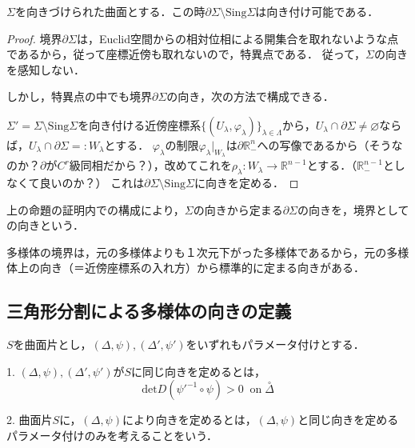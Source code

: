 \documentclass[uplatex, dvipdfmx]{jsreport}
\begin{document}
\begin{proposition*}
    $\Sigma$を向きづけられた曲面とする．この時$\partial\Sigma\setminus\mathrm{Sing}\Sigma$は向き付け可能である．
\end{proposition*}
\begin{proof}
    境界$\partial\Sigma$は，Euclid空間からの相対位相による開集合を取れないような点であるから，従って座標近傍も取れないので，特異点である．
    従って，$\Sigma$の向きを感知しない．

    しかし，特異点の中でも境界$\partial\Sigma$の向き，次の方法で構成できる．

    $\Sigma'=\Sigma\setminus\mathrm{Sing}\Sigma$を向き付ける近傍座標系$\{(U_\lambda,\varphi_\lambda)\}_{\lambda\in\Lambda}$から，$U_\lambda\cap\partial\Sigma\ne\varnothing$ならば，$U_\lambda\cap\partial\Sigma=:W_\lambda$とする．
    $\varphi_\lambda$の制限$\varphi_\lambda|_{W_\lambda}$は$\partial\mathbb{R}^n_-$への写像であるから（そうなのか？$\partial$が$C^r$級同相だから？），改めてこれを$\rho_\lambda:W_\lambda\to\mathbb{R}^{n-1}$とする．（$\mathbb{R}^{n-1}_-$としなくて良いのか？）
    これは$\partial\Sigma\setminus\mathrm{Sing}\Sigma$に向きを定める．
\end{proof}
\begin{definition}
    上の命題の証明内での構成により，$\Sigma$の向きから定まる$\partial\Sigma$の向きを，境界としての向きという．
\end{definition}

\begin{screen}
    多様体の境界は，元の多様体よりも１次元下がった多様体であるから，元の多様体上の向き（＝近傍座標系の入れ方）から標準的に定まる向きがある．
\end{screen}

\subsection{三角形分割による多様体の向きの定義}

\begin{definition}[曲面片の向き]
    $S$を曲面片とし，$(\Delta,\psi),(\Delta',\psi')$をいずれもパラメータ付けとする．
    \begin{center}
    \end{center}

    1. $(\Delta,\psi),(\Delta',\psi')$が$S$に同じ向きを定めるとは，
    \[ \mathrm{det} D(\psi'^{-1}\circ\psi)>0\;\;\mathrm{on}\;\overset{\circ}{\Delta} \]

    2. 曲面片$S$に，$(\Delta,\psi)$により向きを定めるとは，$(\Delta,\psi)$と同じ向きを定めるパラメータ付けのみを考えることをいう．
\end{definition}
\end{document}
